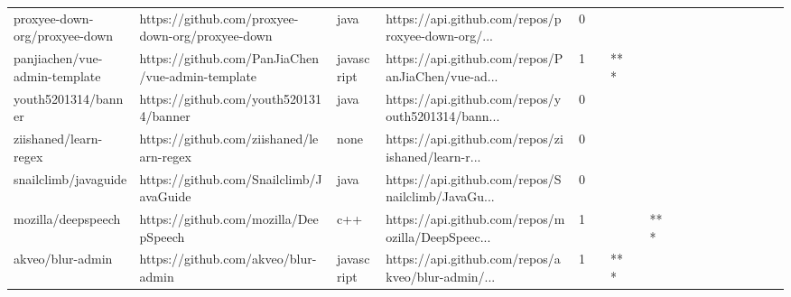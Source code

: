 \begin{tabular}{llllrlllllllllllll}
proxyee-down-org/proxyee-down                      &   https://github.com/proxyee-down-org/proxyee-down &              java &  https://api.github.com/repos/proxyee-down-org/... &       0 &         &        &           &                &                 &        &           &           &          &          &       &              &          \\
panjiachen/vue-admin-template                      &   https://github.com/PanJiaChen/vue-admin-template &        javascript &  https://api.github.com/repos/PanJiaChen/vue-ad... &       1 &         &    *** &           &                &                 &        &           &           &          &          &       &              &          \\
youth5201314/banner                                &             https://github.com/youth5201314/banner &              java &  https://api.github.com/repos/youth5201314/bann... &       0 &         &        &           &                &                 &        &           &           &          &          &       &              &          \\
ziishaned/learn-regex                              &           https://github.com/ziishaned/learn-regex &              none &  https://api.github.com/repos/ziishaned/learn-r... &       0 &         &        &           &                &                 &        &           &           &          &          &       &              &          \\
snailclimb/javaguide                               &            https://github.com/Snailclimb/JavaGuide &              java &  https://api.github.com/repos/Snailclimb/JavaGu... &       0 &         &        &           &                &                 &        &           &           &          &          &       &              &          \\
mozilla/deepspeech                                 &              https://github.com/mozilla/DeepSpeech &               c++ &  https://api.github.com/repos/mozilla/DeepSpeec... &       1 &         &        &           &            *** &                 &        &           &           &          &          &       &              &          \\
akveo/blur-admin                                   &                https://github.com/akveo/blur-admin &        javascript &  https://api.github.com/repos/akveo/blur-admin/... &       1 &         &    *** &           &                &                 &        &           &           &          &          &       &              &          \\

\end{tabular}
